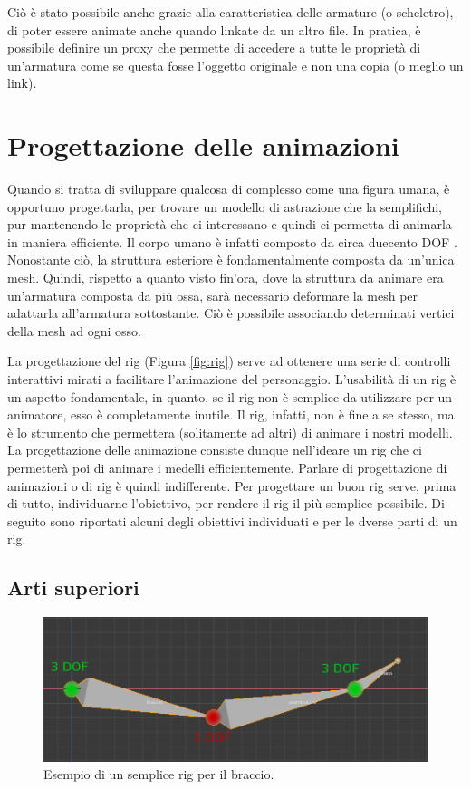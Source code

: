 Ciò è stato possibile anche grazie alla caratteristica delle armature (o scheletro), di poter essere animate anche quando linkate da un altro file.
In pratica, è possibile definire un proxy che permette di accedere a tutte le proprietà di un'armatura come se questa fosse l'oggetto originale e non una copia (o meglio un link).

\section{Progettazione delle animazioni}

Quando si tratta di sviluppare qualcosa di complesso come una figura umana, è opportuno progettarla, per trovare un modello di astrazione che la semplifichi, pur mantenendo le proprietà che ci interessano e quindi ci permetta di animarla in maniera efficiente.
Il corpo umano è infatti composto da circa duecento DOF \cite{Parent:2012:CAA:2385444}.
Nonostante ciò, la struttura esteriore è fondamentalmente composta da un'unica mesh.
Quindi, rispetto a quanto visto fin'ora, dove la struttura da animare era un'armatura composta da più ossa, sarà necessario deformare la mesh per adattarla all'armatura sottostante. Ciò è possibile associando determinati vertici della mesh ad ogni osso.

La progettazione del rig (Figura \ref{fig:rig}) serve ad ottenere una serie di controlli interattivi mirati a facilitare l'animazione del personaggio.
L'usabilità di un rig è un aspetto fondamentale, in quanto, se il rig non è semplice da utilizzare per un animatore, esso è completamente inutile.
Il rig, infatti, non è fine a se stesso, ma è lo strumento che permettera (solitamente ad altri) di animare i nostri modelli.
La progettazione delle animazione consiste dunque nell'ideare un rig che ci permetterà poi di animare i medelli efficientemente. Parlare di progettazione di animazioni o di rig è quindi indifferente.
Per progettare un buon rig serve, prima di tutto, individuarne l'obiettivo, per rendere il rig il più semplice possibile.
Di seguito sono riportati alcuni degli obiettivi individuati e per le dverse parti di un rig.

\newpage
\subsection{Arti superiori}

\begin{figure}
\centering
\includegraphics[width=.8\textwidth]{Figures/arm}
\decoRule
\caption[Rig braccio]{Esempio di un semplice rig per il braccio.}
\label{fig:arm}
\end{figure}


